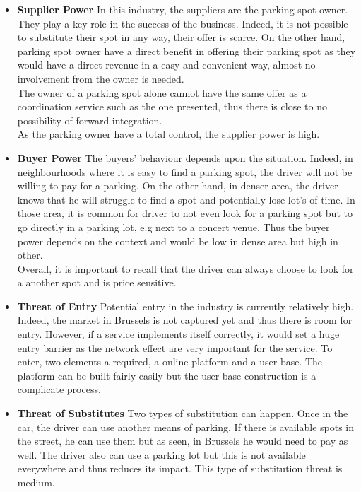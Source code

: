 \documentclass[12pt,a4paper,oneside]{book}
\begin{document}
\begin{itemize}
\item \textbf{Supplier Power} In this industry, the suppliers are the parking spot owner. They play a key role in the success of the business. Indeed, it is not possible to substitute their spot in any way, their offer is scarce. On the other hand, parking spot owner have a direct benefit in offering their parking spot as they would have a direct revenue in a easy and convenient way, almost no involvement from the owner is needed.\\
The owner of a parking spot alone cannot have the same offer as a coordination service such as the one presented, thus there is close to no possibility of forward integration.\\
As the parking owner have a total control, the supplier power is high.
\item \textbf{Buyer Power} The buyers' behaviour depends upon the situation. Indeed, in neighbourhoods where it is easy to find a parking spot, the driver will not be willing to pay for a parking. On the other hand, in denser area, the driver knows that he will struggle to find a spot and potentially lose lot's of time. In those area, it is common for driver to not even look for a parking spot but to go directly in a parking lot, e.g next to a concert venue. Thus the buyer power depends on the context and would be low in dense area but high in other.\\
Overall, it is important to recall that the driver can always choose to look for a another spot and is price sensitive.
\item \textbf{Threat of Entry} Potential entry in the industry is currently relatively high. Indeed, the market in Brussels is not captured yet and thus there is room for entry. However, if a service implements itself correctly, it would set a huge entry barrier as the network effect are very important for the service. To enter, two elements a required, a online platform and a user base. The platform can be built fairly easily but the user base construction is a complicate process.
\item \textbf{Threat of Substitutes} Two types of substitution can happen. Once in the car, the driver can use another means of parking. If there is available spots in the street, he can use them but as seen, in Brussels he would need to pay as well. The driver also can use a parking lot but this is not available everywhere and thus reduces its impact. This type of substitution threat is medium.\\

\end{itemize}
\end{document}
